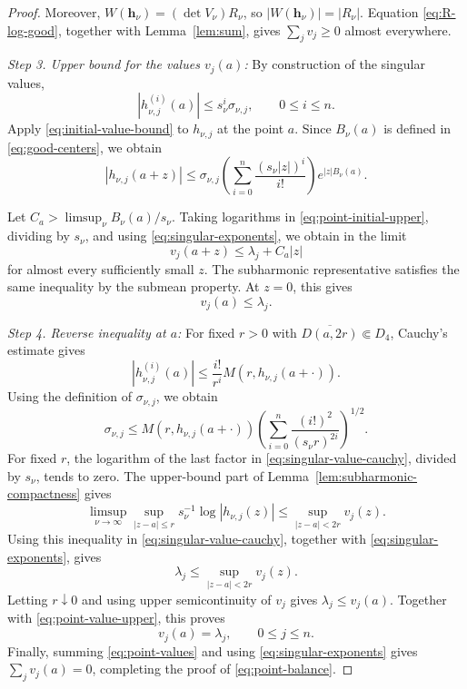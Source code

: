 \documentclass[12pt,letterpaper,reqno]{amsart}
\theoremstyle{definition}
\numberwithin{equation}{section}
\newcommand{\hv}{\bm h}
\begin{document}
\begin{proof}
Moreover,
\(W(\hv_\nu)=(\det V_\nu)R_\nu\), so
\(|W(\hv_\nu)|=|R_\nu|\). Equation
\eqref{eq:R-log-good}, together with Lemma~\ref{lem:sum}, gives
\(\sum_jv_j\geq0\) almost everywhere.


\medskip\noindent
\emph{{Step 3. Upper bound for the values \(v_j(a)\):}}
By construction of the singular values,
\[
|h_{\nu,j}^{(i)}(a)|
\leq
s_\nu^i\sigma_{\nu,j},
\qquad
0\leq i\leq n.
\]
Apply \eqref{eq:initial-value-bound} to \(h_{\nu,j}\) at the point
\(a\). Since \(B_\nu(a)\) is defined in
\eqref{eq:good-centers}, we obtain
\begin{equation}\label{eq:point-initial-upper}
 |h_{\nu,j}(a+z)|
 \leq
 \sigma_{\nu,j}
 \left(
 \sum_{i=0}^{n}
 \frac{(s_\nu|z|)^i}{i!}
 \right)
 e^{|z|B_\nu(a)}.
\end{equation}

Let
\(C_a>\limsup_\nu B_\nu(a)/s_\nu\).
Taking logarithms in \eqref{eq:point-initial-upper}, dividing by
\(s_\nu\), and using \eqref{eq:singular-exponents}, we obtain in the
limit
\[
v_j(a+z)\leq\lambda_j+C_a|z|
\]
for almost every sufficiently small \(z\). The subharmonic
representative satisfies the same inequality by the submean property.
At \(z=0\), this gives
\begin{equation}\label{eq:point-value-upper}
 v_j(a)\leq\lambda_j.
\end{equation}


\medskip\noindent
\emph{{Step 4. Reverse inequality at \(a\):}}
For fixed \(r>0\) with
\(\overline{D(a,2r)}\Subset D_4\), Cauchy's estimate gives
\[
|h_{\nu,j}^{(i)}(a)|
\leq
\frac{i!}{r^i}
M(r,h_{\nu,j}(a+\cdot)).
\]
Using the definition of \(\sigma_{\nu,j}\), we obtain
\begin{equation}\label{eq:singular-value-cauchy}
 \sigma_{\nu,j}
 \leq
 M(r,h_{\nu,j}(a+\cdot))
 \left(
 \sum_{i=0}^{n}
 \frac{(i!)^2}{(s_\nu r)^{2i}}
 \right)^{1/2}.
\end{equation}
For fixed \(r\), the logarithm of the last factor in
\eqref{eq:singular-value-cauchy}, divided by \(s_\nu\), tends to zero.
The upper-bound part of
Lemma~\ref{lem:subharmonic-compactness} gives
\[
\limsup_{\nu\to\infty}
\sup_{|z-a|\leq r}
s_\nu^{-1}\log|h_{\nu,j}(z)|
\leq
\sup_{|z-a|<2r}v_j(z).
\]
Using this inequality in \eqref{eq:singular-value-cauchy}, together
with \eqref{eq:singular-exponents}, gives
\[
\lambda_j
\leq
\sup_{|z-a|<2r}v_j(z).
\]
Letting \(r\downarrow0\) and using upper semicontinuity of \(v_j\)
gives \(\lambda_j\leq v_j(a)\). Together with
\eqref{eq:point-value-upper}, this proves
\begin{equation}\label{eq:point-values}
 v_j(a)=\lambda_j,
 \qquad
 0\leq j\leq n.
\end{equation}
Finally, summing \eqref{eq:point-values} and using
\eqref{eq:singular-exponents} gives
\(\sum_jv_j(a)=0\), completing the proof of
\eqref{eq:point-balance}.
\end{proof}
\end{document}
